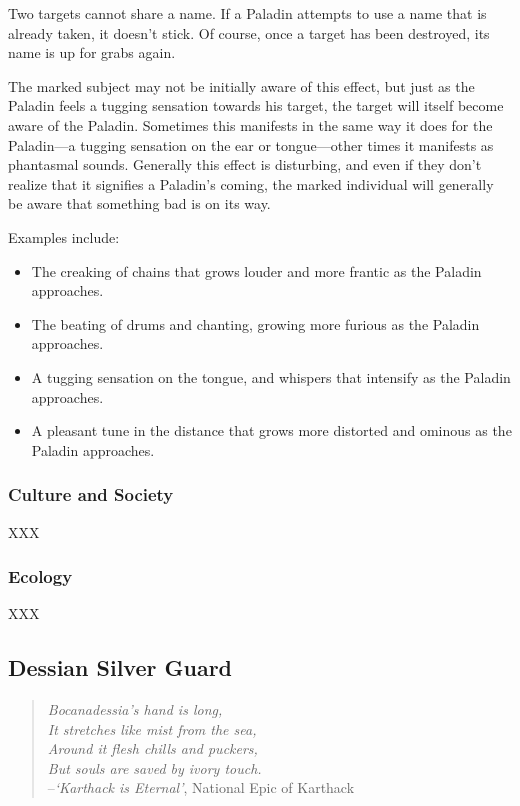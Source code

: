 \documentclass[oneside,11pt,english]{book}
\begin{document}
Two targets cannot share a name. If a Paladin attempts to use a name that is already taken, it doesn't stick. Of course, once a target has been destroyed, its name is up for grabs again.


The marked subject may not be initially aware of this effect, but just as the Paladin feels a tugging sensation towards his target, the target will itself become aware of the Paladin.
Sometimes this manifests in the same way it does for the Paladin—a tugging sensation on the ear or tongue—other times it manifests as phantasmal sounds.
Generally this effect is disturbing, and even if they don't realize that it signifies a Paladin's coming, the marked individual will generally be aware that something bad is on its way. 


Examples include:
\begin{itemize}
\item The creaking of chains that grows louder and more frantic as the Paladin approaches. 
\item The beating of drums and chanting, growing more furious as the Paladin approaches. 
\item A tugging sensation on the tongue, and whispers that intensify as the Paladin approaches. 
\item A pleasant tune in the distance that grows more distorted and ominous as the Paladin 
approaches. 
\end{itemize}
\subsubsection*{Culture and Society} 
XXX 
\subsubsection*{Ecology} 
XXX 
\subsection{Dessian Silver Guard}
\begin{verse}
	\emph{Bocanadessia's hand is long,\\
It stretches like mist from the sea,\\
Around it flesh chills and puckers,\\
But souls are saved by ivory touch.}\\

--\textit{‘Karthack is Eternal’}, National Epic of Karthack
\end{verse}
\end{document}
